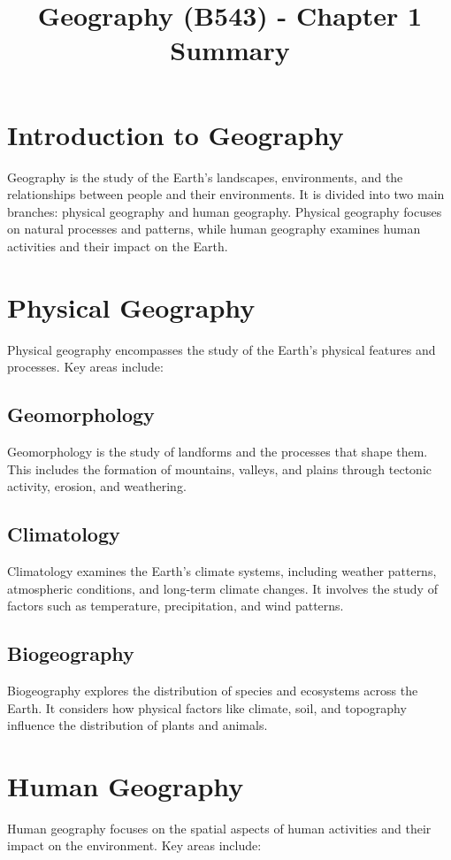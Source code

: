 \documentclass[12pt]{article}
\title{Geography (B543) - Chapter 1 Summary}
\author{}
\date{}
\begin{document}
\maketitle

\section*{Introduction to Geography}
Geography is the study of the Earth's landscapes, environments, and the relationships between people and their environments. It is divided into two main branches: physical geography and human geography. Physical geography focuses on natural processes and patterns, while human geography examines human activities and their impact on the Earth.

\section*{Physical Geography}
Physical geography encompasses the study of the Earth's physical features and processes. Key areas include:

\subsection*{Geomorphology}
Geomorphology is the study of landforms and the processes that shape them. This includes the formation of mountains, valleys, and plains through tectonic activity, erosion, and weathering.

\subsection*{Climatology}
Climatology examines the Earth's climate systems, including weather patterns, atmospheric conditions, and long-term climate changes. It involves the study of factors such as temperature, precipitation, and wind patterns.

\subsection*{Biogeography}
Biogeography explores the distribution of species and ecosystems across the Earth. It considers how physical factors like climate, soil, and topography influence the distribution of plants and animals.

\section*{Human Geography}
Human geography focuses on the spatial aspects of human activities and their impact on the environment. Key areas include:
\end{document}

